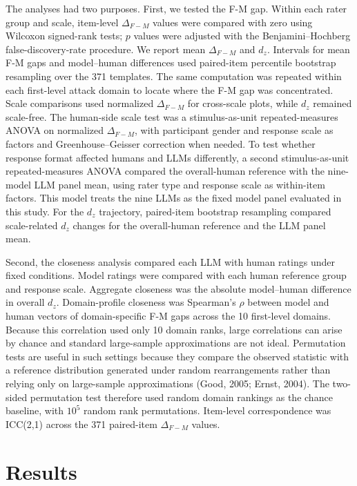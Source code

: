 \documentclass[a4paper,fleqn,review]{cas-sc}
\begin{document}
The analyses had two purposes. First, we tested the F-M gap. Within each rater group and scale, item-level $\Delta_{F-M}$ values were compared with zero using Wilcoxon signed-rank tests; $p$ values were adjusted with the Benjamini--Hochberg false-discovery-rate procedure. We report mean $\Delta_{F-M}$ and $d_z$. Intervals for mean F-M gaps and model--human differences used paired-item percentile bootstrap resampling over the 371 templates. The same computation was repeated within each first-level attack domain to locate where the F-M gap was concentrated. Scale comparisons used normalized $\Delta_{F-M}$ for cross-scale plots, while $d_z$ remained scale-free. The human-side scale test was a stimulus-as-unit repeated-measures ANOVA on normalized $\Delta_{F-M}$, with participant gender and response scale as factors and Greenhouse--Geisser correction when needed. To test whether response format affected humans and LLMs differently, a second stimulus-as-unit repeated-measures ANOVA compared the overall-human reference with the nine-model LLM panel mean, using rater type and response scale as within-item factors. This model treats the nine LLMs as the fixed model panel evaluated in this study. For the $d_z$ trajectory, paired-item bootstrap resampling compared scale-related $d_z$ changes for the overall-human reference and the LLM panel mean.

Second, the closeness analysis compared each LLM with human ratings under fixed conditions. Model ratings were compared with each human reference group and response scale. Aggregate closeness was the absolute model--human difference in overall $d_z$. Domain-profile closeness was Spearman's $\rho$ between model and human vectors of domain-specific F-M gaps across the 10 first-level domains. Because this correlation used only 10 domain ranks, large correlations can arise by chance and standard large-sample approximations are not ideal. Permutation tests are useful in such settings because they compare the observed statistic with a reference distribution generated under random rearrangements rather than relying only on large-sample approximations (Good, 2005; Ernst, 2004). The two-sided permutation test therefore used random domain rankings as the chance baseline, with $10^5$ random rank permutations. Item-level correspondence was ICC(2,1) across the 371 paired-item $\Delta_{F-M}$ values.

\section{Results}
\label{sec:results}
\end{document}
